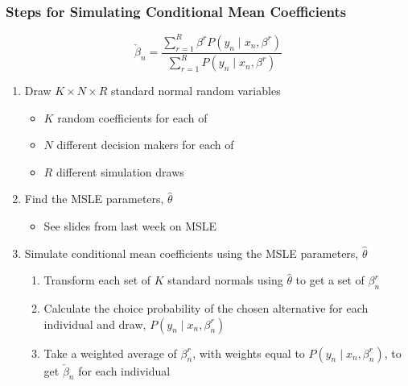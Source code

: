 \documentclass{beamer}\usepackage[]{graphicx}\usepackage[]{color}
\makeatletter
\newcommand{\hlnum}[1]{\textcolor[rgb]{0.686,0.059,0.569}{#1}}%
\newcommand{\hlcom}[1]{\textcolor[rgb]{0.678,0.584,0.686}{\textit{#1}}}%
\newcommand{\hlopt}[1]{\textcolor[rgb]{0,0,0}{#1}}%
\newcommand{\hlstd}[1]{\textcolor[rgb]{0.345,0.345,0.345}{#1}}%
\newcommand{\hlkwb}[1]{\textcolor[rgb]{0.69,0.353,0.396}{#1}}%
\newcommand{\hlkwc}[1]{\textcolor[rgb]{0.333,0.667,0.333}{#1}}%
\newcommand{\hlkwd}[1]{\textcolor[rgb]{0.737,0.353,0.396}{\textbf{#1}}}%
\newenvironment{kframe}{%
 \def\at@end@of@kframe{}%
 \ifinner\ifhmode%
  \def\at@end@of@kframe{\end{minipage}}%
  \begin{minipage}{\columnwidth}%
 \fi\fi%
 \def\FrameCommand##1{\hskip\@totalleftmargin \hskip-\fboxsep
 \colorbox{shadecolor}{##1}\hskip-\fboxsep
     \hskip-\linewidth \hskip-\@totalleftmargin \hskip\columnwidth}%
 \MakeFramed {\advance\hsize-\width
   \@totalleftmargin\z@ \linewidth\hsize
   \@setminipage}}%
 {\par\unskip\endMakeFramed%
 \at@end@of@kframe}
\newenvironment{knitrout}{}{} %
\makeatother
\begin{document}
\begin{frame}\frametitle{Steps for Simulating Conditional Mean Coefficients}
    $$\check{\beta}_n = \frac{\sum_{r = 1}^R \beta^r P(y_n \mid x_n, \beta^r)}{\sum_{r = 1}^R P(y_n \mid x_n, \beta^r)}$$
    \begin{enumerate}
        \item Draw $K \times N \times R$ standard normal random variables
        \begin{itemize}
            \item $K$ random coefficients for each of
            \item $N$ different decision makers for each of
            \item $R$ different simulation draws
        \end{itemize}
        \item Find the MSLE parameters, $\hat{\theta}$
        \begin{itemize}
            \item See slides from last week on MSLE
        \end{itemize}
        \item Simulate conditional mean coefficients using the MSLE parameters, $\hat{\theta}$
        \begin{enumerate}
            \item Transform each set of $K$ standard normals using $\hat{\theta}$ to get a set of $\beta_n^r$
            \item Calculate the choice probability of the chosen alternative for each individual and draw, $P(y_n \mid x_n, \beta_n^r)$
            \item Take a weighted average of $\beta_n^r$, with weights equal to $P(y_n \mid x_n, \beta_n^r)$, to get $\check{\beta}_n$ for each individual
        \end{enumerate}
    \end{enumerate}
\end{frame}

\end{document}
